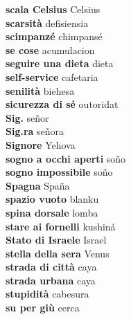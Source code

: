 \textbf{ scala Celsius  } Celsius \\
\textbf{ scarsità  } defisiensia \\
\textbf{ scimpanzé  } chimpansé \\
\textbf{ se cose  } acumulacion \\
\textbf{ seguire una dieta  } dieta \\
\textbf{ self-service  } cafetaria \\
\textbf{ senilità  } biehesa \\
\textbf{ sicurezza di sé  } outoridat \\
\textbf{ Sig.  } señor \\
\textbf{ Sig.ra  } señora \\
\textbf{ Signore  } Yehova \\
\textbf{ sogno a occhi aperti  } soño \\
\textbf{ sogno impossibile  } soño \\
\textbf{ Spagna  } Spaña \\
\textbf{ spazio vuoto  } blanku \\
\textbf{ spina dorsale  } lomba \\
\textbf{ stare ai fornelli  } kushiná \\
\textbf{ Stato di Israele  } Israel \\
\textbf{ stella della sera  } Venus \\
\textbf{ strada di città  } caya \\
\textbf{ strada urbana  } caya \\
\textbf{ stupidità  } cabesura \\
\textbf{ su per giù  } cerca \\
